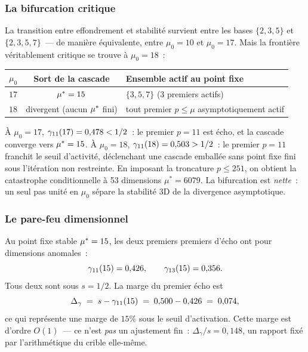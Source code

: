 \documentclass[12pt,a4paper]{article}
\begin{document}
\subsubsection{La bifurcation critique}
\label{sec:ch8_critical_bifurcation}

La transition entre effondrement et stabilité survient entre les
bases $\{2,3,5\}$ et $\{2,3,5,7\}$~--- de manière équivalente, entre
$\mu_0 = 10$ et $\mu_0 = 17$. Mais la frontière véritablement critique
se trouve à $\mu_0 = 18$~:

\begin{center}
\begin{tabular}{lcl}
\toprule
$\mu_0$ & Sort de la cascade & Ensemble actif au point fixe \\
\midrule
$17$ & ${\mu^{*}} = 15$ & $\{3,5,7\}$ \quad (3 premiers actifs) \\
$18$ & divergent (aucun ${\mu^{*}}$ fini) & tout premier $p \leq \mu$
  asymptotiquement actif \\
\bottomrule
\end{tabular}
\end{center}

À $\mu_0 = 17$, $\gamma_{11}(17) = 0{,}478 < 1/2$~: le premier
$p = 11$ est écho, et la cascade converge vers ${\mu^{*}} = 15$.
À $\mu_0 = 18$, $\gamma_{11}(18) = 0{,}503 > 1/2$~: le premier
$p = 11$ franchit le seuil d'activité, déclenchant une cascade
emballée sans point fixe fini sous l'itération non restreinte.
En imposant la troncature $p \leq 251$, on obtient la catastrophe
conditionnelle à 53 dimensions $\mu^* = 6079$. La bifurcation est
\emph{nette}~: un seul pas unité en $\mu_0$ sépare la stabilité 3D
de la divergence asymptotique.

\subsubsection{Le pare-feu dimensionnel}
\label{sec:ch8_firewall}

Au point fixe stable ${\mu^{*}} = 15$, les deux premiers premiers
d'écho ont pour dimensions anomales~:
\begin{equation}
  \gamma_{11}(15) = 0{,}426, \qquad \gamma_{13}(15) = 0{,}356.
  \label{eq:ghost_gamma_values}
\end{equation}
Tous deux sont sous $s = 1/2$. La marge du premier écho est
\begin{equation}
  \Delta_\gamma \;=\; s - \gamma_{11}(15) \;=\; 0{,}500 - 0{,}426 \;=\; 0{,}074,
  \label{eq:firewall_margin}
\end{equation}
ce qui représente une marge de $15\%$ sous le seuil d'activation.
Cette marge est d'ordre $O(1)$~--- ce n'est \emph{pas} un
ajustement fin~: $\Delta_\gamma / s = 0{,}148$, un rapport fixé par
l'arithmétique du crible elle-même.
\end{document}
